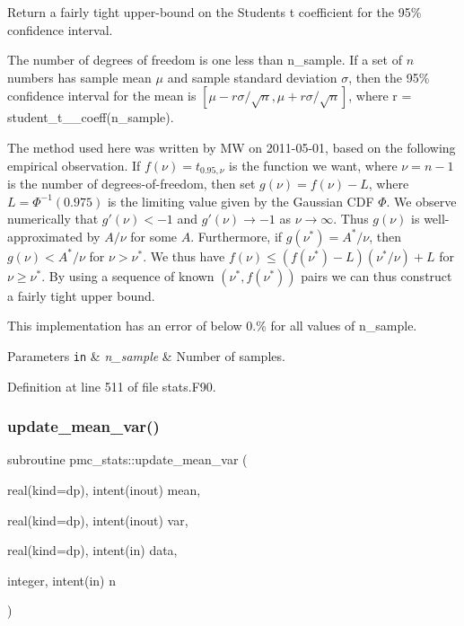 Return a fairly tight upper-\/bound on the Student\textquotesingle{}s t coefficient for the 95\% confidence interval. 

The number of degrees of freedom is one less than {\ttfamily n\+\_\+sample}. If a set of $n$ numbers has sample mean $\mu$ and sample standard deviation $\sigma$, then the 95\% confidence interval for the mean is $[\mu - r\sigma/\sqrt{n}, \mu + r\sigma/\sqrt{n}]$, where {\ttfamily r = student\+\_\+t\+\_\+\_\+coeff(n\+\_\+sample)}.

The method used here was written by MW on 2011-\/05-\/01, based on the following empirical observation. If $f(\nu) = t_{0.95,\nu}$ is the function we want, where $\nu = n - 1$ is the number of degrees-\/of-\/freedom, then set $g(\nu) = f(\nu) - L$, where $L = \Phi^{-1}(0.975)$ is the limiting value given by the Gaussian C\+DF $\Phi$. We observe numerically that $g'(\nu) < -1$ and $g'(\nu) \to -1$ as $\nu \to \infty$. Thus $g(\nu)$ is well-\/approximated by $A/\nu$ for some $A$. Furthermore, if $g(\nu^*) = A^*/\nu$, then $g(\nu) < A^*/\nu$ for $\nu > \nu^*$. We thus have $f(\nu) \le (f(\nu^*) - L) (\nu^* / \nu) + L$ for $\nu \ge \nu^*$. By using a sequence of known $(\nu^*, f(\nu^*))$ pairs we can thus construct a fairly tight upper bound.

This implementation has an error of below 0.\% for all values of {\ttfamily n\+\_\+sample}.


\begin{DoxyParams}[1]{Parameters}
\mbox{\tt in}  & {\em n\+\_\+sample} & Number of samples. \\
\hline
\end{DoxyParams}


Definition at line 511 of file stats.\+F90.

\mbox{\label{namespacepmc__stats_a03fc23e0f58ef39a98b3fab675f7ec2f}} 
\subsubsection{\texorpdfstring{update\+\_\+mean\+\_\+var()}{update\_mean\_var()}}
{\footnotesize\ttfamily subroutine pmc\+\_\+stats\+::update\+\_\+mean\+\_\+var (\begin{DoxyParamCaption}\item[{real(kind=dp), intent(inout)}]{mean,  }\item[{real(kind=dp), intent(inout)}]{var,  }\item[{real(kind=dp), intent(in)}]{data,  }\item[{integer, intent(in)}]{n }\end{DoxyParamCaption})}



